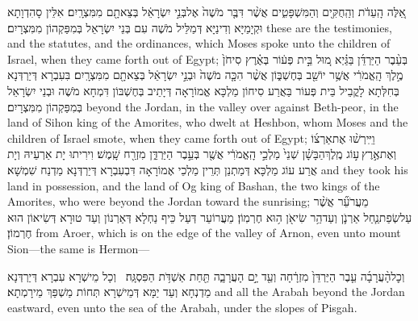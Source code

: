 {אֵ֚לֶּה הָֽעֵדֹ֔ת וְהַֽחֻקִּ֖ים וְהַמִּשְׁפָּטִ֑ים אֲשֶׁ֨ר דִּבֶּ֤ר מֹשֶׁה֙ אֶל\maqqaf בְּנֵ֣י יִשְׂרָאֵ֔ל בְּצֵאתָ֖ם מִמִּצְרָֽיִם׃}
{אִלֵּין סָהִדְוָתָא וּקְיָמַיָּא וְדִינַיָּא דְּמַלֵּיל מֹשֶׁה עִם בְּנֵי יִשְׂרָאֵל בְּמִפַּקְהוֹן מִמִּצְרָיִם׃}
{these are the testimonies, and the statutes, and the ordinances, which Moses spoke unto the children of Israel, when they came forth out of Egypt;}{}
{בְּעֵ֨בֶר הַיַּרְדֵּ֜ן בַּגַּ֗יְא מ֚וּל בֵּ֣ית פְּע֔וֹר בְּאֶ֗רֶץ סִיחֹן֙ מֶ֣לֶךְ הָֽאֱמֹרִ֔י אֲשֶׁ֥ר יוֹשֵׁ֖ב בְּחֶשְׁבּ֑וֹן אֲשֶׁ֨ר הִכָּ֤ה מֹשֶׁה֙ וּבְנֵ֣י יִשְׂרָאֵ֔ל בְּצֵאתָ֖ם מִמִּצְרָֽיִם׃}
{בִּעִבְרָא דְּיַרְדְּנָא בְּחִלְּתָא לָקֳבֵיל בֵּית פְּעוֹר בַּאֲרַע סִיחוֹן מַלְכָּא אֱמוֹרָאָה דְּיָתֵיב בְּחֶשְׁבּוֹן דִּמְחָא מֹשֶׁה וּבְנֵי יִשְׂרָאֵל בְּמִפַּקְהוֹן מִמִּצְרָיִם׃}
{beyond the Jordan, in the valley over against Beth-peor, in the land of Sihon king of the Amorites, who dwelt at Heshbon, whom Moses and the children of Israel smote, when they came forth out of Egypt;}{}
{וַיִּֽירְשׁ֨וּ אֶת\maqqaf אַרְצ֜וֹ וְאֶת\maqqaf אֶ֣רֶץ \legarmeh  ע֣וֹג מֶֽלֶךְ\maqqaf הַבָּשָׁ֗ן שְׁנֵי֙ מַלְכֵ֣י הָֽאֱמֹרִ֔י אֲשֶׁ֖ר בְּעֵ֣בֶר הַיַּרְדֵּ֑ן מִזְרַ֖ח שָֽׁמֶשׁ׃}
{וִירִיתוּ יָת אַרְעֵיהּ וְיָת אֲרַע עוֹג מַלְכָּא דְּמַתְנַן תְּרֵין מַלְכֵי אֶמוֹרָאָה דִּבְעִבְרָא דְּיַרְדְּנָא מַדְנַח שִׁמְשָׁא׃}
{and they took his land in possession, and the land of Og king of Bashan, the two kings of the Amorites, who were beyond the Jordan toward the sunrising;}{}
{מֵעֲרֹעֵ֞ר אֲשֶׁ֨ר עַל\maqqaf שְׂפַת\maqqaf נַ֧חַל אַרְנֹ֛ן וְעַד\maqqaf הַ֥ר שִׂיאֹ֖ן ה֥וּא חֶרְמֽוֹן׃}
{מֵעֲרוֹעֵר דְּעַל כֵּיף נַחְלָא דְּאַרְנוֹן וְעַד טוּרָא דְּשִׂיאוֹן הוּא חֶרְמוֹן׃}
{from Aroer, which is on the edge of the valley of Arnon, even unto mount Sion—the same is Hermon—}{}

{וְכׇל\maqqaf הָ֨עֲרָבָ֜ה עֵ֤בֶר הַיַּרְדֵּן֙ מִזְרָ֔חָה וְעַ֖ד יָ֣ם הָעֲרָבָ֑ה תַּ֖חַת אַשְׁדֹּ֥ת הַפִּסְגָּֽה׃ \petucha }
{וְכָל מֵישְׁרָא עִבְרָא דְּיַרְדְּנָא מַדְנְחָא וְעַד יַמָּא דְּמֵישְׁרָא תְּחוֹת מַשְׁפַּךְ מֵירָמְתָא׃}
{and all the Arabah beyond the Jordan eastward, even unto the sea of the Arabah, under the slopes of Pisgah.}{}

